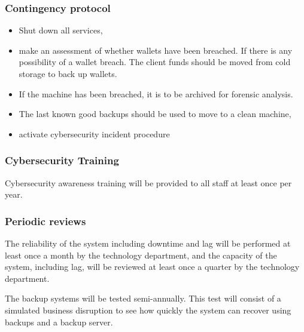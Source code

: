 \subsubsection{Contingency protocol}
\begin{itemize}
\item Shut down all services,
  \item make an assessment of whether wallets have been breached.  If
    there is any possibility of a wallet breach.  The client funds should be
    moved from cold storage to back up wallets.
\item If the machine has been breached, it is to be archived for
  forensic analysis.
\item The last known good backups should be used to
  move to a clean machine,
\item activate cybersecurity incident procedure
\end{itemize}

\subsubsection{Cybersecurity Training}
Cybersecurity awareness training will be provided to all staff at
least once per year.

\subsubsection{Periodic reviews}

The reliability of the system including downtime and lag will be
performed at least once a month by the technology department, and the
capacity of the system, including lag, will be reviewed at least once a
quarter by the technology department.

The backup systems will be tested semi-annually.  This test will
consist of a simulated business disruption to see how quickly the
system can recover using backups and a backup server.

